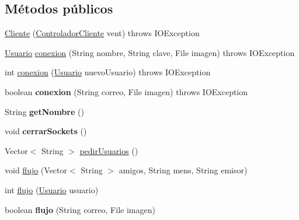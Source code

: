 \subsection*{Métodos públicos}
\begin{DoxyCompactItemize}
\item 
\hyperlink{classcom_1_1ucab_1_1javachat_1_1_cliente_1_1model_1_1_cliente_a96a7afffdedcb21e2fa287056460c163}{Cliente} (\hyperlink{classcom_1_1ucab_1_1javachat_1_1_cliente_1_1controller_1_1_controlador_cliente}{Controlador\-Cliente} vent)  throws I\-O\-Exception    
\item 
\hyperlink{classcom_1_1ucab_1_1javachat_1_1_cliente_1_1model_1_1_usuario}{Usuario} \hyperlink{classcom_1_1ucab_1_1javachat_1_1_cliente_1_1model_1_1_cliente_ad187c584feac2fbaddf36074a7d7ee64}{conexion} (String nombre, String clave, File imagen)  throws I\-O\-Exception 
\item 
int \hyperlink{classcom_1_1ucab_1_1javachat_1_1_cliente_1_1model_1_1_cliente_a56292074d2a5b409b5056db1d07168bd}{conexion} (\hyperlink{classcom_1_1ucab_1_1javachat_1_1_cliente_1_1model_1_1_usuario}{Usuario} nuevo\-Usuario)  throws I\-O\-Exception 
\item 
\hypertarget{classcom_1_1ucab_1_1javachat_1_1_cliente_1_1model_1_1_cliente_a8ff5750a0dd7b1e68373f49be2662ca3}{boolean {\bfseries conexion} (String correo, File imagen)  throws I\-O\-Exception }\label{classcom_1_1ucab_1_1javachat_1_1_cliente_1_1model_1_1_cliente_a8ff5750a0dd7b1e68373f49be2662ca3}

\item 
\hypertarget{classcom_1_1ucab_1_1javachat_1_1_cliente_1_1model_1_1_cliente_a2f102f095b1bd161a90a3d13f1285eeb}{String {\bfseries get\-Nombre} ()}\label{classcom_1_1ucab_1_1javachat_1_1_cliente_1_1model_1_1_cliente_a2f102f095b1bd161a90a3d13f1285eeb}

\item 
\hypertarget{classcom_1_1ucab_1_1javachat_1_1_cliente_1_1model_1_1_cliente_ada58df8e38b7252aee067a222029f1bb}{void {\bfseries cerrar\-Sockets} ()}\label{classcom_1_1ucab_1_1javachat_1_1_cliente_1_1model_1_1_cliente_ada58df8e38b7252aee067a222029f1bb}

\item 
Vector$<$ String $>$ \hyperlink{classcom_1_1ucab_1_1javachat_1_1_cliente_1_1model_1_1_cliente_ae828d3c313aa6e5a38129433baf036ab}{pedir\-Usuarios} ()
\item 
void \hyperlink{classcom_1_1ucab_1_1javachat_1_1_cliente_1_1model_1_1_cliente_a6a000d747c356a8fc093fb9299185b0c}{flujo} (Vector$<$ String $>$ amigos, String mens, String emisor)
\item 
int \hyperlink{classcom_1_1ucab_1_1javachat_1_1_cliente_1_1model_1_1_cliente_ac98f059bfb01929a8fcae393be001e07}{flujo} (\hyperlink{classcom_1_1ucab_1_1javachat_1_1_cliente_1_1model_1_1_usuario}{Usuario} usuario)
\item 
\hypertarget{classcom_1_1ucab_1_1javachat_1_1_cliente_1_1model_1_1_cliente_ae3d51eeea6685fce41818e231c28fd11}{boolean {\bfseries flujo} (String correo, File imagen)}\label{classcom_1_1ucab_1_1javachat_1_1_cliente_1_1model_1_1_cliente_ae3d51eeea6685fce41818e231c28fd11}


\end{DoxyCompactItemize}
